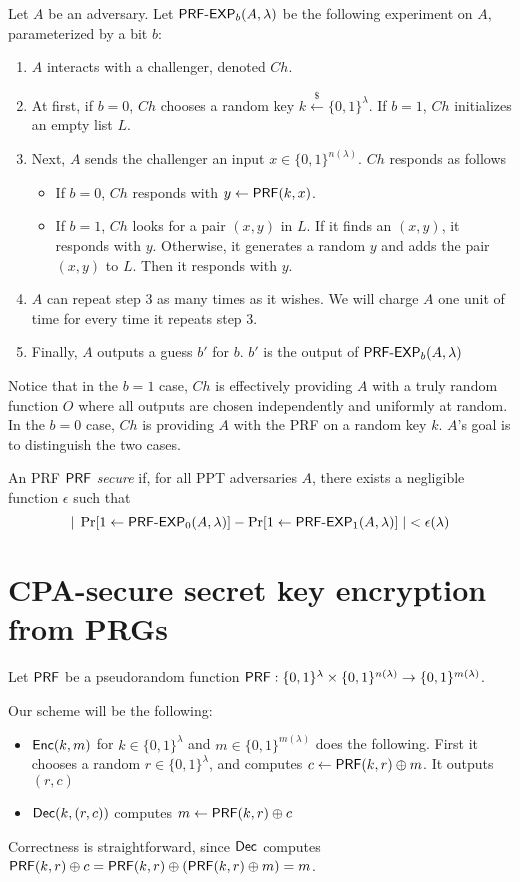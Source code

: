 Let $A$ be an adversary.  Let $\text{\sf PRF-EXP}_b(A,\lambda)$ be the following experiment on $A$, parameterized by a bit $b$:
\begin{enumerate}
	\item $A$ interacts with a challenger, denoted $Ch$.
	\item At first, if $b=0$, $Ch$ chooses a random key $k\stackrel{\$}{\gets}\{0,1\}^\lambda$.  If $b=1$, $Ch$ initializes an empty list $L$.
	\item Next, $A$ sends the challenger an input $x\in\{0,1\}^{n(\lambda)}$.  $Ch$ responds as follows
	\begin{itemize}
		\item If $b=0$, $Ch$ responds with $y\gets{\sf PRF}(k,x)$.
		\item If $b=1$, $Ch$ looks for a pair $(x,y)$ in $L$.  If it finds an $(x,y)$, it responds with $y$.  Otherwise, it generates a random $y$ and adds the pair $(x,y)$ to $L$.  Then it responds with $y$.
	\end{itemize}
	\item $A$ can repeat step 3 as many times as it wishes.  We will charge $A$ one unit of time for every time it repeats step 3.
	\item Finally, $A$ outputs a guess $b'$ for $b$.  $b'$ is the output of $\text{\sf PRF-EXP}_b(A,\lambda)$
\end{enumerate}

Notice that in the $b=1$ case, $Ch$ is effectively providing $A$ with a truly random function $O$ where all outputs are chosen independently and uniformly at random.  In the $b=0$ case, $Ch$ is providing $A$ with the PRF on a random key $k$.  $A$'s goal is to distinguish the two cases.

\begin{definition} An PRF ${\sf PRF}$ \emph{secure} if, for all PPT adversaries $A$, there exists a negligible function $\epsilon$ such that
	\[|\;\Pr[1\gets\text{\sf PRF-EXP}_0(A,\lambda)]-\Pr[1\gets\text{\sf PRF-EXP}_1(A,\lambda)]\;|<\epsilon(\lambda)\]
\end{definition}


\section{CPA-secure secret key encryption from PRGs}

Let ${\sf PRF}$ be a pseudorandom function ${\sf PRF}:\{0,1\}^\lambda\times\{0,1\}^{n(\lambda)}\rightarrow\{0,1\}^{m(\lambda)}$.  

Our scheme will be the following:
\begin{itemize}
	\item ${\sf Enc}(k,m)$ for $k\in\{0,1\}^\lambda$ and $m\in\{0,1\}^{m(\lambda)}$ does the following.  First it chooses a random $r\in\{0,1\}^\lambda$, and computes $c\gets{\sf PRF}(k,r)\oplus m$.  It outputs $(r,c)$
	\item ${\sf Dec}(k,(r,c))$ computes $m\gets{\sf PRF}(k,r)\oplus c$
\end{itemize}
Correctness is straightforward, since ${\sf Dec}$ computes ${\sf PRF}(k,r)\oplus c={\sf PRF}(k,r)\oplus({\sf PRF}(k,r)\oplus m)=m$.


